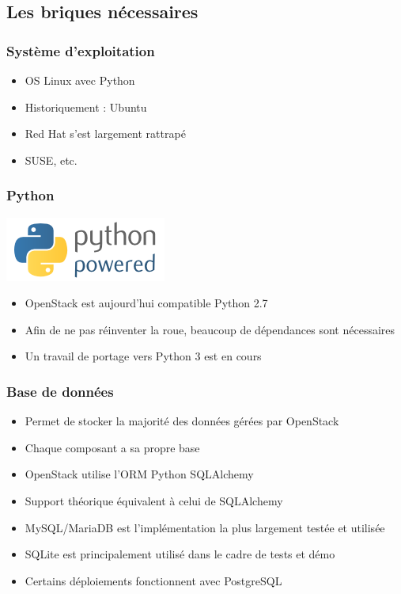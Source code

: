   \subsection[Les briques nécessaires]{Les briques nécessaires}
  \begin{frame}
    \frametitle{Système d'exploitation}
    \begin{itemize}
      \item OS Linux avec Python
      \item Historiquement : Ubuntu
      \item Red Hat s'est largement rattrapé
      \item SUSE, etc.
    \end{itemize}
  \end{frame}

  \begin{frame}
    \frametitle{Python}
    \begin{center}
      \includegraphics{images/python-powered.png}
    \end{center}
    \begin{itemize}
      \item OpenStack est aujourd'hui compatible Python 2.7
      \item Afin de ne pas réinventer la roue, beaucoup de dépendances sont nécessaires
      \item Un travail de portage vers Python 3 est en cours
    \end{itemize}
  \end{frame}

  \begin{frame}
    \frametitle{Base de données}
    \begin{itemize}
      \item Permet de stocker la majorité des données gérées par OpenStack
      \item Chaque composant a sa propre base
      \item OpenStack utilise l'ORM Python SQLAlchemy
      \item Support théorique équivalent à celui de SQLAlchemy
      \item MySQL/MariaDB est l'implémentation la plus largement testée et utilisée
      \item SQLite est principalement utilisé dans le cadre de tests et démo
      \item Certains déploiements fonctionnent avec PostgreSQL
    \end{itemize}
  \end{frame}


